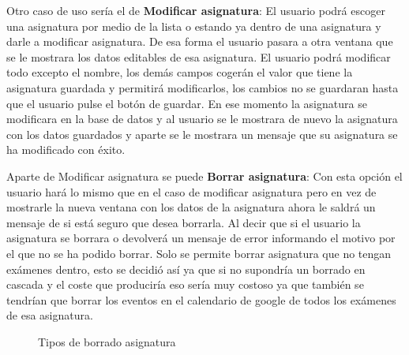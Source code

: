 Otro caso de uso sería el de \textbf{Modificar asignatura}:
El usuario podrá escoger una asignatura por medio de la lista o estando ya dentro de una asignatura y darle a modificar asignatura. De esa forma el usuario pasara a otra ventana que se le mostrara los datos editables de esa asignatura.
El usuario podrá modificar todo excepto el nombre, los demás campos cogerán el valor que tiene la asignatura guardada y permitirá modificarlos, los cambios no se guardaran hasta que el usuario pulse el botón de guardar.
En ese momento la asignatura se modificara en la base de datos y al usuario se le mostrara de nuevo la asignatura con los datos guardados y aparte se le mostrara un mensaje que su asignatura se ha modificado con éxito.

Aparte de Modificar asignatura se puede \textbf{Borrar asignatura}:
Con esta opción el usuario hará lo mismo que en el caso de modificar asignatura pero en vez de mostrarle la nueva ventana con los datos de la asignatura ahora le saldrá un mensaje de si está seguro que desea borrarla. 
Al decir que si el usuario la asignatura se borrara o devolverá un mensaje de error informando el motivo por el que no se ha podido borrar.
Solo se permite borrar asignatura que no tengan exámenes dentro, esto se decidió así ya que si no supondría un borrado en cascada y el coste que produciría eso sería muy costoso ya que también se tendrían que borrar los eventos en el calendario de google de todos los exámenes de esa asignatura.

\begin{figure}[H]
 \centering
 \caption{Tipos de borrado asignatura}
 \label{f:Tipos de borrado asignatura}
\end{figure}

